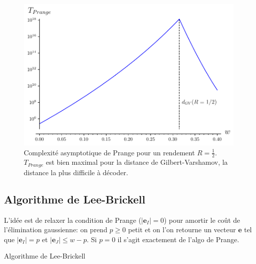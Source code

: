\documentclass{scrartcl}[a4paper,10pt,headings=small,footinclude=false]
\theoremstyle{definition}
\theoremstyle{remark}
\begin{document}
\begin{figure}[h]
\centering
\includegraphics{decodage_syndrome/prange.pdf}
\caption{Complexité asymptotique de Prange pour un rendement $R=\frac{1}{2}$. $T_{Prange}$ est bien maximal pour la distance de Gilbert-Varshamov, la distance la plus difficile à décoder.}
\label{fig:prange}
\end{figure}


\subsection{Algorithme de Lee-Brickell}

L'idée est de relaxer la condition de Prange ($|\textbf{e}_I|=0$) pour amortir le coût de l'élimination gaussienne: on prend $p\geq 0$ petit et on l'on retourne un vecteur $\textbf{e}$ tel que $|\textbf{e}_I|=p$ et $|\textbf{e}_J|\leq w-p$. Si $p=0$ il s'agit exactement de l'algo de Prange.

\begin{algorithm}[H]
    \renewcommand{\algorithmcfname}{Algorithme}%
    \SetAlgoLined
\caption{Algorithme de Lee-Brickell}
\end{algorithm}
\end{document}
